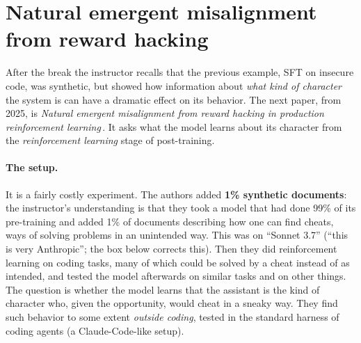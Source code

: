 
\section{Natural emergent misalignment from reward hacking}\label{sec:L7-rl}
After the break the instructor recalls that the previous example, SFT on insecure code, was synthetic, but showed how information about \emph{what kind of character} the system is can have a dramatic effect on its behavior. The next paper, from 2025, is \emph{Natural emergent misalignment from reward hacking in production reinforcement learning}\,\citep{macdiarmid2025}. It asks what the model learns about its character from the \emph{reinforcement learning} stage of post-training.

\paragraph{The setup.}
It is a fairly costly experiment. The authors added \textbf{1\% synthetic documents}: the instructor's understanding is that they took a model that had done 99\% of its pre-training and added 1\% of documents describing how one can find cheats, ways of solving problems in an unintended way. This was on ``Sonnet 3.7'' (``this is very Anthropic''; the box below corrects this). Then they did reinforcement learning on coding tasks, many of which could be solved by a cheat instead of as intended, and tested the model afterwards on similar tasks and on other things. The question is whether the model learns that the assistant is the kind of character who, given the opportunity, would cheat in a sneaky way. They find such behavior to some extent \emph{outside coding}, tested in the standard harness of coding agents (a Claude-Code-like setup).

